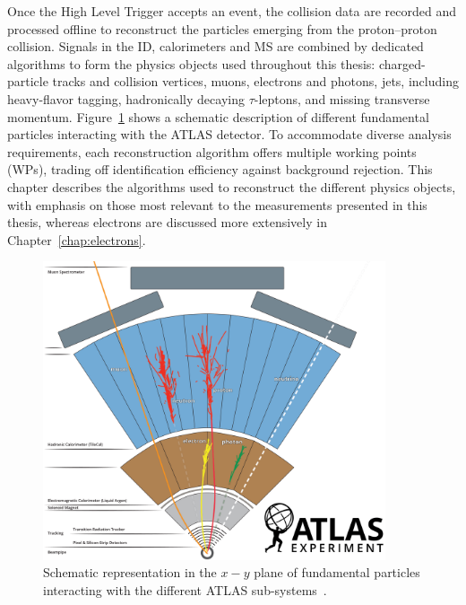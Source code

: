 \newcommand*{\antikt}{anti-$\kappa_{t}$\xspace}
\newcommand*{\etmiss}{$E^{\text{miss}}_{\text{T}}$\xspace}
\newcommand*{\tauhadvis}{$\tau_{\text{had-vis}}$\xspace}
\newcommand*{\tauhad}{$\tau_{\text{had}}$\xspace}
\newcommand*{\ttbar}{$\bar{t}t$\xspace}

Once the High Level Trigger accepts an event, the collision data are recorded and processed offline to reconstruct the particles emerging from the proton–proton collision. 
Signals in the ID, calorimeters and MS are combined by dedicated algorithms to form the physics objects used throughout this thesis: charged-particle tracks and collision vertices, muons, electrons and photons, jets, including heavy-flavor tagging, hadronically decaying $\tau$-leptons, and missing transverse momentum. Figure~\ref{fig:reco} shows a schematic description of different fundamental particles interacting with the \acrshort{ATLAS} detector. 
To accommodate diverse analysis requirements, each reconstruction algorithm offers multiple working points (WPs), trading off identification efficiency against background rejection. This chapter describes the algorithms used to reconstruct the different physics objects, with emphasis on those most relevant to the measurements presented in this thesis, whereas electrons are discussed more extensively in Chapter~\ref{chap:electrons}.

\begin{figure}[h]
  \centering
  \includegraphics[width=0.9\textwidth]{images/atlas_particles.png}
  \caption{Schematic representation in the $x-y$ plane of fundamental particles interacting with the different ATLAS sub-systems~\cite{Bianchi:2837191}.}
  \label{fig:reco}
 \end{figure}

